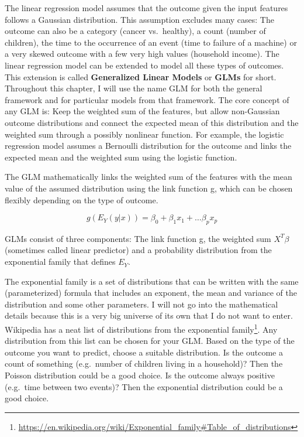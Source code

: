 \documentclass[
  11pt,
]{scrbook}
\renewcommand{\href}[2]{#2\footnote{\url{#1}}}
\begin{document}
The linear regression model assumes that the outcome given the input features follows a Gaussian distribution.
This assumption excludes many cases:
The outcome can also be a category (cancer vs.~healthy), a count (number of children), the time to the occurrence of an event (time to failure of a machine) or a very skewed outcome with a few very high values (household income).
The linear regression model can be extended to model all these types of outcomes.
This extension is called \textbf{Generalized Linear Models} or \textbf{GLMs} for short.
Throughout this chapter, I will use the name GLM for both the general framework and for particular models from that framework.
The core concept of any GLM is:
Keep the weighted sum of the features, but allow non-Gaussian outcome distributions and connect the expected mean of this distribution and the weighted sum through a possibly nonlinear function.
For example, the logistic regression model assumes a Bernoulli distribution for the outcome and links the expected mean and the weighted sum using the logistic function.

The GLM mathematically links the weighted sum of the features with the mean value of the assumed distribution using the link function g, which can be chosen flexibly depending on the type of outcome.

\[g(E_Y(y|x))=\beta_0+\beta_1{}x_{1}+\ldots{}\beta_p{}x_{p}\]

GLMs consist of three components:
The link function g, the weighted sum \(X^T\beta\) (sometimes called linear predictor) and a probability distribution from the exponential family that defines \(E_Y\).

The exponential family is a set of distributions that can be written with the same (parameterized) formula that includes an exponent, the mean and variance of the distribution and some other parameters.
I will not go into the mathematical details because this is a very big universe of its own that I do not want to enter.
Wikipedia has a neat \href{https://en.wikipedia.org/wiki/Exponential_family\#Table_of_distributions}{list of distributions from the exponential family}.
Any distribution from this list can be chosen for your GLM.
Based on the type of the outcome you want to predict, choose a suitable distribution.
Is the outcome a count of something (e.g.~number of children living in a household)?
Then the Poisson distribution could be a good choice.
Is the outcome always positive (e.g.~time between two events)?
Then the exponential distribution could be a good choice.
\end{document}
